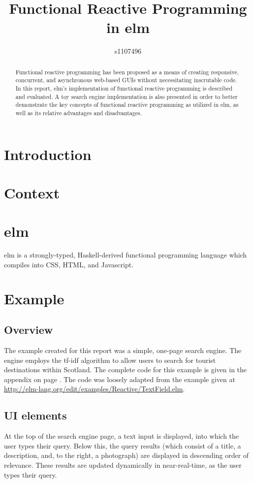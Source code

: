 \documentclass[12pt]{article}
\begin{document}
\title{Functional Reactive Programming in elm}
\author{s1107496}

\maketitle

\begin{abstract}
Functional reactive programming has been proposed as a means of 
creating responsive, concurrent, and asynchronous web-based GUIs without necessitating inscrutable code. In this report, elm's implementation of functional reactive programming
is described and evaluated. A toy search engine implementation is also
presented in order to better demonstrate the key concepts of functional
reactive programming as utilized in elm, as well as its relative advantages 
and disadvantages.
\end{abstract}

\section{Introduction}

\section{Context}

\section{elm}
elm is a strongly-typed, Haskell-derived functional programming language which compiles into CSS, HTML, and Javascript. 

\section{Example}

\subsection{Overview}
The example created for this report was a simple, one-page search engine. The engine 
employs the tf-idf algorithm to allow users to search for tourist destinations within
Scotland. The complete code for this example is given in the appendix on page \pageref{app:A}. The code was loosely adapted from the example given at 
\url{http://elm-lang.org/edit/examples/Reactive/TextField.elm}.

\subsection{UI elements}
At the top of the search engine page, a text input is displayed, into which the user
types their query. Below this, the query results (which consist of a title, a 
description, and, to the right, a photograph) are displayed in descending order of
relevance. These results are updated dynamically in near-real-time, as the user types 
their query.
\end{document}
